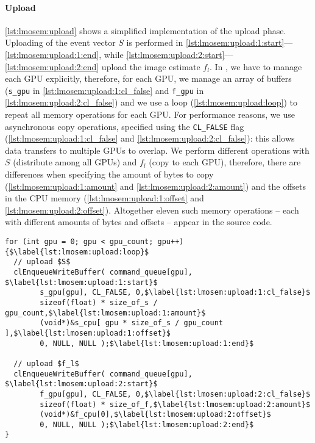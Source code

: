 \paragraph{Upload}
\autoref{lst:lmosem:upload} shows a simplified \OpenCL implementation of the upload phase.
Uploading of the event vector $S$ is performed in \autoref{lst:lmosem:upload:1:start}---\autoref{lst:lmosem:upload:1:end}, while \autoref{lst:lmosem:upload:2:start}---\autoref{lst:lmosem:upload:2:end} upload the image estimate $f_l$.
In \OpenCL, we have to manage each GPU explicitly, therefore, for each GPU, we manage an array of buffers (\texttt{s\_gpu} in \autoref{lst:lmosem:upload:1:cl_false} and \texttt{f\_gpu} in \autoref{lst:lmosem:upload:2:cl_false}) and we use a loop (\autoref{lst:lmosem:upload:loop}) to repeat all memory operations for each GPU.
For performance reasons, we use asynchronous copy operations, specified using the \texttt{CL\_FALSE} flag (\autoref{lst:lmosem:upload:1:cl_false} and \autoref{lst:lmosem:upload:2:cl_false}): this allows data transfers to multiple GPUs to overlap.
We perform different operations with $S$ (distribute among all GPUs) and $f_l$ (copy to each GPU), therefore, there are differences when specifying the amount of bytes to copy (\autoref{lst:lmosem:upload:1:amount} and \autoref{lst:lmosem:upload:2:amount}) and the offsets in the CPU memory (\autoref{lst:lmosem:upload:1:offset} and \autoref{lst:lmosem:upload:2:offset}).
Altogether eleven such memory operations -- each with different amounts of bytes and offsets -- appear in the \OpenCL source code.

\begin{lstlisting}[float,
  caption={[Implementation of the upload phase of the LM OSEM in \OpenCL.]Implementation of the upload phase in \OpenCL (omitting error checks for brevity).},
  label={lst:lmosem:upload}]
for (int gpu = 0; gpu < gpu_count; gpu++) {$\label{lst:lmosem:upload:loop}$
  // upload $S$
  clEnqueueWriteBuffer( command_queue[gpu], $\label{lst:lmosem:upload:1:start}$
        s_gpu[gpu], CL_FALSE, 0,$\label{lst:lmosem:upload:1:cl_false}$
        sizeof(float) * size_of_s / gpu_count,$\label{lst:lmosem:upload:1:amount}$
        (void*)&s_cpu[ gpu * size_of_s / gpu_count ],$\label{lst:lmosem:upload:1:offset}$
        0, NULL, NULL );$\label{lst:lmosem:upload:1:end}$

  // upload $f_l$
  clEnqueueWriteBuffer( command_queue[gpu], $\label{lst:lmosem:upload:2:start}$
        f_gpu[gpu], CL_FALSE, 0,$\label{lst:lmosem:upload:2:cl_false}$
        sizeof(float) * size_of_f,$\label{lst:lmosem:upload:2:amount}$
        (void*)&f_cpu[0],$\label{lst:lmosem:upload:2:offset}$
        0, NULL, NULL );$\label{lst:lmosem:upload:2:end}$
}
\end{lstlisting}

